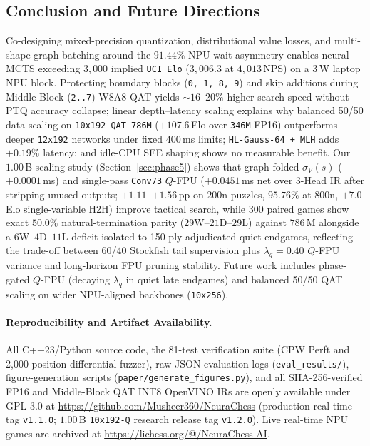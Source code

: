 \documentclass[10pt,twocolumn]{article}
\begin{document}
\subsection{Conclusion and Future Directions}
Co-designing mixed-precision quantization, distributional value losses, and multi-shape graph batching around the $91.44\%$ NPU-wait asymmetry enables neural MCTS exceeding $3{,}000$ implied \texttt{UCI\_Elo} ($3{,}006.3$ at $4{,}013$\,NPS) on a 3\,W laptop NPU block. Protecting boundary blocks (\texttt{0, 1, 8, 9}) and skip additions during Middle-Block (\texttt{2..7}) W8A8 QAT yields ${\sim}16\text{--}20\%$ higher search speed without PTQ accuracy collapse; linear depth--latency scaling explains why balanced 50/50 data scaling on \texttt{10x192-QAT-786M} ($+107.6$\,Elo over \texttt{346M} FP16) outperforms deeper \texttt{12x192} networks under fixed $400$\,ms limits; \texttt{HL-Gauss-64 + MLH} adds $+0.19\%$ latency; and idle-CPU SEE shaping shows no measurable benefit. Our $1.00$\,B scaling study (Section~\ref{sec:phase5}) shows that graph-folded $\sigma_V(s)$ ($+0.0001$\,ms) and single-pass \texttt{Conv73} $Q$-FPU ($+0.0451$\,ms net over 3-Head IR after stripping unused outputs; $+1.11$--$+1.56$\,pp on $200\text{n}$ puzzles, $95.76\%$ at $800\text{n}$, $+7.0$\,Elo single-variable H2H) improve tactical search, while $300$ paired games show exact $50.0\%$ natural-termination parity ($29\text{W}\text{--}21\text{D}\text{--}29\text{L}$) against $786$\,M alongside a $6\text{W}\text{--}4\text{D}\text{--}11\text{L}$ deficit isolated to 150-ply adjudicated quiet endgames, reflecting the trade-off between 60/40 Stockfish tail supervision plus $\lambda_q=0.40$ $Q$-FPU variance and long-horizon FPU pruning stability. Future work includes phase-gated $Q$-FPU (decaying $\lambda_q$ in quiet late endgames) and balanced 50/50 QAT scaling on wider NPU-aligned backbones (\texttt{10x256}).

\paragraph{Reproducibility and Artifact Availability.}
All C++23/Python source code, the 81-test verification suite (CPW Perft and 2,000-position differential fuzzer), raw JSON evaluation logs (\texttt{eval\_results/}), figure-generation scripts (\texttt{paper/generate\_figures.py}), and all SHA-256-verified FP16 and Middle-Block QAT INT8 OpenVINO IRs are openly available under GPL-3.0 at \url{https://github.com/Musheer360/NeuraChess} (production real-time tag \texttt{v1.1.0}; $1.00$\,B \texttt{10x192-Q} research release tag \texttt{v1.2.0}). Live real-time NPU games are archived at \url{https://lichess.org/@/NeuraChess-AI}.
\end{document}
